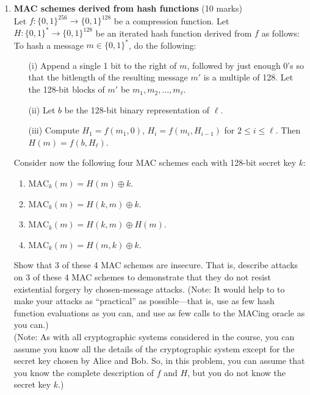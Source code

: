 \documentclass[11pt]{article}
\begin{document}
\begin{enumerate}
\item {\bf MAC schemes derived from hash functions} (10 marks)\\
Let $f : \{0,1\}^{256} \rightarrow \{0,1\}^{128}$ be a compression function.
Let $H : \{0,1\}^* \rightarrow \{0,1\}^{128}$ be an iterated hash function
derived from $f$ as follows: To hash a message $m \in \{0,1\}^*$, do the
following:
\begin{itemize}
\item[(i)] Append a single 1 bit to the right of $m$, followed by just
      enough $0$'s so that the bitlength of the resulting message $m'$
      is a multiple of 128. Let the 128-bit blocks of $m'$ be
      $m_1, m_2, \ldots, m_{\ell}$.
\item[(ii)] Let $b$ be the 128-bit binary representation of $\ell$.
\item[(iii)] Compute $H_1 = f(m_1,0)$, $H_i = f(m_i,H_{i-1})$ for
             $2 \leq i \leq \ell$. Then $H(m) = f(b,H_\ell)$.
\end{itemize}
Consider now the following four MAC schemes each with 128-bit secret key
$k$:
\begin{enumerate}
\item $\mbox{MAC}_k(m) = H(m) \oplus k$.
\item $\mbox{MAC}_k(m) = H(k,m) \oplus k$.
\item $\mbox{MAC}_k(m) = H(k,m) \oplus H(m)$.
\item $\mbox{MAC}_k(m) = H(m,k) \oplus k$.
\end{enumerate}
Show that 3 of these 4 MAC schemes are insecure. That is, describe
attacks on 3 of these 4 MAC schemes to demonstrate that they do not resist
existential forgery by chosen-message attacks. (Note: It would help to
to make your attacks as ``practical'' as possible---that is, use as
few hash function evaluations as you can, and use as few calls to the
MACing oracle as you can.)\\
(Note: As with all cryptographic systems considered in the course, you
can assume you know all the details of the cryptographic system except
for the secret key chosen by Alice and Bob. So, in this problem, you
can assume that you know the complete description of $f$ and $H$, but
you do not know the secret key $k$.)

\end{enumerate}
\end{document}
